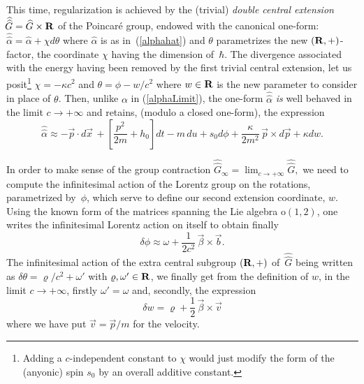 \documentclass[a4paper,11pt]{article}
\newcommand{\bR}{{\bf R}}
\newcommand{\vx}{{\vec x}}
\def\vb{{\vec b}}
\def\vbeta{{\vec\beta}}
\def\vp{{\vec p}}
\def\vv{{\vec v}}
\def\vx{{\vec x}}
\begin{document}
This time, regularization
is achieved by the (trivial) {\it double central extension}\
$\widehat{\!\widehat{G}}=\widehat{G}\times\bR$
of the Poincar\'e group, endowed with the canonical one-form:
$
\widehat{\!\widehat{\alpha}}
=
\widehat{\alpha}
+
\chi{}d\theta
$
where $\widehat{\alpha}$ is as in~(\ref{alphahat}) and $\theta$ parametrizes
the new $(\bR,+)$-factor, the coordinate $\chi$ having the dimension
of~$\hbar$.
  The divergence associated with the energy having been removed by the first
trivial central extension, let us posit\footnote{Adding a
$c$-independent constant to
$\chi$ would just modify the form of the (anyonic) spin $s_0$ by an overall
additive constant.}
$
\chi=-\kappa{}c^2
$
and
$
\theta=\phi-{w}/{c^2}
$
where $w\in\bR$ is the new parameter to consider in place of $\theta$.
Then, unlike $\alpha$ in (\ref{alphaLimit}), the one-form
$\widehat{\!\widehat{\alpha}}$
{\it is} well behaved
in the limit $c\to+\infty$ and retains, (modulo a closed one-form),
the expression
\begin{equation}
\widehat{\!\widehat{\alpha}}
\approx
-\vp\cdot d\vx\,
+\left[
\frac{p^2}{2m}+h_0
\right]dt
-m\,du
+s_0d\phi
+
\frac{\kappa}{2m^2}\,\vp\times{}d\vp
+\kappa{}dw.
\label{alphaLimitOK}
\end{equation}



In order to make sense of the group contraction
$
\widehat{\!\widehat{G}}_\infty=\lim_{c\to+\infty}\widehat{\!\widehat{G}},
$
we need to compute the infinitesimal action of the Lorentz group on the
rotations, parametrized by~$\phi$, which serve to define our second extension
coordinate, $w$.
Using the known form of the matrices spanning
the Lie algebra $\mathrm{o}(1,2)$, one writes the infinitesimal
Lorentz action
on itself to obtain  finally
\begin{equation}
\delta\phi
\approx
\omega+\frac{1}{2c^2}\,\vbeta\times\vb.
\label{deltaphi}
\end{equation}
The infinitesimal action of the extra central subgroup $(\bR,+)$ of
$\,\widehat{\!\widehat{G}}$
being written as
$
\delta{\theta}={\varrho}/{c^2}+\omega'
$
with $\varrho,\omega'\in\bR$, we finally get from the definition of
$w$, in the limit
$c\to+\infty$, firstly $\omega'=\omega$ and, secondly, the
expression
\begin{equation}
\delta{w}=\varrho+\frac{1}{2}\,\vbeta\times\vv
\label{exoticExtensionAction}
\end{equation}
where we have put $\vv=\vp/m$ for the
velocity.
\end{document}
